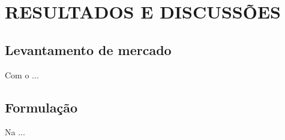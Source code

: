 \chapter{\textbf{RESULTADOS E DISCUSSÕES}}

\section{Levantamento de mercado}

Com o ...

\section{Formulação}

Na ...

\